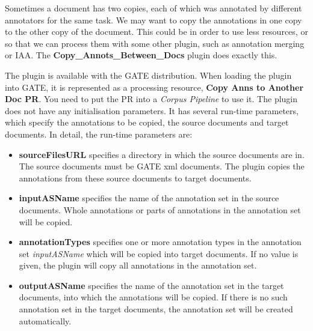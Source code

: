 
Sometimes a document has two copies, each of which was annotated by different
annotators for the same task. We may want to copy the annotations in one copy
to the other copy of the document. This could be in order to use less
resources, or so that we can process them with some other plugin, such as
annotation merging or IAA. The {\bf Copy\_Annots\_Between\_Docs} plugin does
exactly this.

The plugin is available with the GATE distribution.  When loading the plugin
into GATE, it is represented as a processing resource, {\bf Copy Anns to
  Another Doc PR}. You need to put the PR into a {\em Corpus Pipeline} to use
it. The plugin does not have any initialisation parameters. It has several
run-time parameters, which specify the annotations to be copied, the source
documents and target documents. In detail, the run-time parameters are:

\begin{itemize}
\item {\bf sourceFilesURL} specifies a directory in which the source documents
  are in.  The source documents must be GATE xml documents. The plugin copies
  the annotations from these source documents to target documents.
\item {\bf inputASName} specifies the name of the annotation set in the source
  documents.  Whole annotations or parts of annotations in the annotation set
  will be copied.
\item {\bf annotationTypes} specifies one or more annotation types in the
  annotation set {\em inputASName} which will be copied into target documents.
  If no value is given, the plugin will copy all annotations in the annotation
  set.
\item {\bf outputASName} specifies the name of the annotation set in the
  target documents, into which the annotations will be copied. If there is no
  such annotation set in the target documents, the annotation set will be
  created automatically.
\end{itemize}

